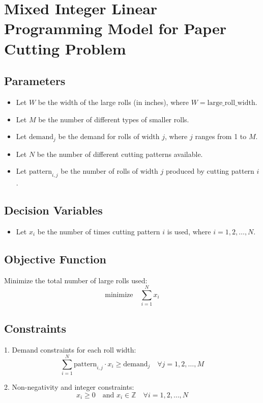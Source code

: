 \documentclass{article}
\begin{document}
\section*{Mixed Integer Linear Programming Model for Paper Cutting Problem}

\subsection*{Parameters}
\begin{itemize}
    \item Let \( W \) be the width of the large rolls (in inches), where \( W = \text{large\_roll\_width} \).
    \item Let \( M \) be the number of different types of smaller rolls.
    \item Let \( \text{demand}_j \) be the demand for rolls of width \( j \), where \( j \) ranges from 1 to \( M \).
    \item Let \( N \) be the number of different cutting patterns available.
    \item Let \( \text{pattern}_{i,j} \) be the number of rolls of width \( j \) produced by cutting pattern \( i \).
\end{itemize}

\subsection*{Decision Variables}
\begin{itemize}
    \item Let \( x_i \) be the number of times cutting pattern \( i \) is used, where \( i = 1, 2, \ldots, N \).
\end{itemize}

\subsection*{Objective Function}
Minimize the total number of large rolls used:
\[
\text{minimize} \quad \sum_{i=1}^{N} x_i
\]

\subsection*{Constraints}
1. Demand constraints for each roll width:
\[
\sum_{i=1}^{N} \text{pattern}_{i,j} \cdot x_i \geq \text{demand}_j \quad \forall j = 1, 2, \ldots, M
\]

2. Non-negativity and integer constraints:
\[
x_i \geq 0 \quad \text{and } x_i \in \mathbb{Z} \quad \forall i = 1, 2, \ldots, N
\]
\end{document}
